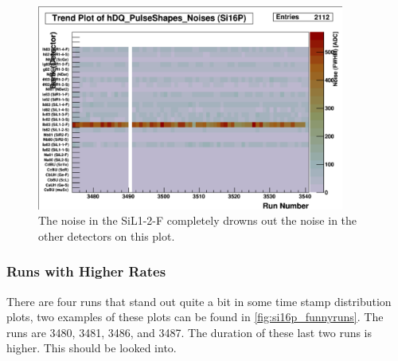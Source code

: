 \documentclass[a4paper]{article}
\begin{document}
\begin{figure}
  \centering
  \includegraphics[width=0.9\textwidth]{figs/si16p/noise}
  \caption{The noise in the SiL1-2-F completely drowns out the noise in the other detectors on this plot.}
  \label{fig:si16p_noise}
\end{figure}


\subsubsection{Runs with Higher Rates}
There are four runs that stand out quite a bit in some time stamp distribution plots, two examples of these plots can
be found in \ref{fig:si16p_funnyruns}. The runs are 3480, 3481, 3486, and 3487. The duration of these last two runs is
higher. This should be looked into.
\end{document}
